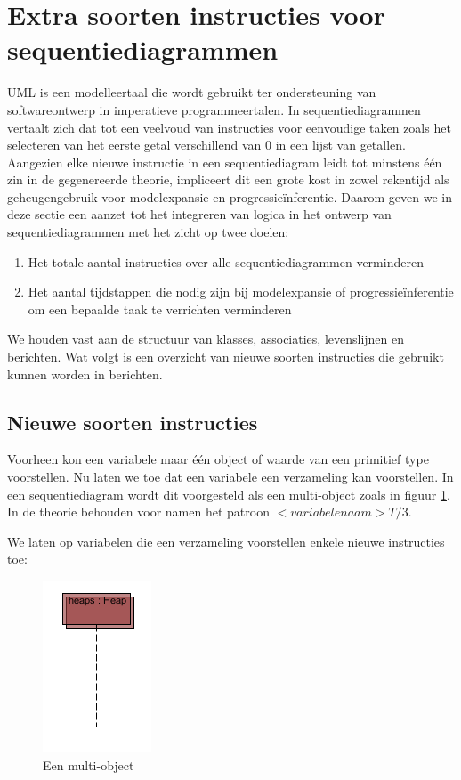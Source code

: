\section{Extra soorten instructies voor sequentiediagrammen}\label{sec:newlang}
UML is een modelleertaal die wordt gebruikt ter ondersteuning van softwareontwerp in imperatieve programmeertalen. In sequentiediagrammen vertaalt zich dat tot een veelvoud van instructies voor eenvoudige taken zoals het selecteren van het eerste getal verschillend van 0 in een lijst van getallen. Aangezien elke nieuwe instructie in een sequentiediagram leidt tot minstens \'e\'en zin in de gegenereerde theorie, impliceert dit een grote kost in zowel rekentijd als geheugengebruik voor modelexpansie en progressie\"inferentie. Daarom geven we in deze sectie een aanzet tot het integreren van logica in het ontwerp van sequentiediagrammen met het zicht op twee doelen:

\begin{enumerate}
	\item Het totale aantal instructies over alle sequentiediagrammen verminderen
	\item Het aantal tijdstappen die nodig zijn bij modelexpansie of progressie\"inferentie om een bepaalde taak te verrichten verminderen
\end{enumerate}

We houden vast aan de structuur van klasses, associaties, levenslijnen en berichten. Wat volgt is een overzicht van nieuwe soorten instructies die gebruikt kunnen worden in berichten.

\subsection{Nieuwe soorten instructies}

Voorheen kon een variabele maar \'e\'en object of waarde van een primitief type voorstellen. Nu laten we toe dat een variabele een verzameling kan voorstellen. In een sequentiediagram wordt dit voorgesteld als een multi-object zoals in figuur \ref{fig:multi-object}. In de theorie behouden voor namen het patroon $<variabelenaam>T/3$.

We laten op variabelen die een verzameling voorstellen enkele nieuwe instructies toe:

\begin{figure}
	\includegraphics{chap-gedrag/seq-multi-object.png}
	\centering
	\caption{Een multi-object}
	\label{fig:multi-object}
\end{figure}

